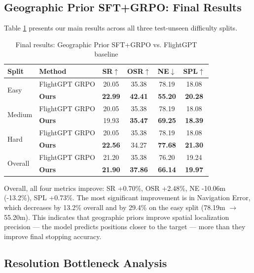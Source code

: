 \documentclass[conference]{IEEEtran}
\begin{document}
\subsection{Geographic Prior SFT+GRPO: Final Results}

Table \ref{tab:final} presents our main results across all three test-unseen difficulty splits.

\begin{table}[h]
\centering
\caption{Final results: Geographic Prior SFT+GRPO vs. FlightGPT baseline}
\label{tab:final}
\begin{tabular}{llcccc}
\toprule
Split & Method & SR$\uparrow$ & OSR$\uparrow$ & NE$\downarrow$ & SPL$\uparrow$ \\
\midrule
\multirow{2}{*}{Easy} 
& FlightGPT GRPO & 20.05 & 35.38 & 78.19 & 18.08 \\
& \textbf{Ours} & \textbf{22.99} & \textbf{42.41} & \textbf{55.20} & \textbf{20.28} \\
\midrule
\multirow{2}{*}{Medium} 
& FlightGPT GRPO & 20.05 & 35.38 & 78.19 & 18.08 \\
& \textbf{Ours} & 19.93 & \textbf{35.47} & \textbf{69.25} & \textbf{18.39} \\
\midrule
\multirow{2}{*}{Hard} 
& FlightGPT GRPO & 20.05 & 35.38 & 78.19 & 18.08 \\
& \textbf{Ours} & \textbf{22.56} & 34.27 & \textbf{77.68} & \textbf{21.30} \\
\midrule
\multirow{2}{*}{Overall} 
& FlightGPT GRPO & 21.20 & 35.38 & 76.20 & 19.24 \\
& \textbf{Ours} & \textbf{21.90} & \textbf{37.86} & \textbf{66.14} & \textbf{19.97} \\
\bottomrule
\end{tabular}
\end{table}

Overall, all four metrics improve: SR +0.70\%, OSR +2.48\%, NE -10.06m (-13.2\%), SPL +0.73\%. The most significant improvement is in Navigation Error, which decreases by 13.2\% overall and by 29.4\% on the easy split (78.19m $\rightarrow$ 55.20m). This indicates that geographic priors improve spatial localization precision --- the model predicts positions closer to the target --- more than they improve final stopping accuracy.

\subsection{Resolution Bottleneck Analysis}
\end{document}

